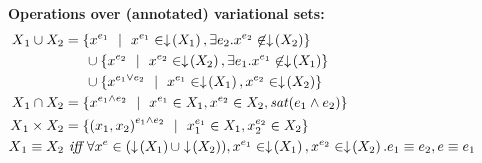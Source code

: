 \begin{figure}
\medskip 
\textbf{Operations over (annotated) variational sets:}
\begin{alignat*}{1}
\vset_1 \cup \vset_2 &= \setDef {\annot [\dimMeta_1] \elem \myOR \annot [\dimMeta_1] \elem \in \pushIn {\vset_1}, \exists \dimMeta_2. \annot [\dimMeta_2] \elem \not \in \pushIn{\vset_2}}\\
&\hspace{15pt} \cup \setDef {\annot [\dimMeta_2] \elem \myOR \annot [\dimMeta_2] \elem \in \pushIn {\vset_2}, 
\exists \dimMeta_1. \annot [\dimMeta_1] \elem  \not \in \pushIn {\vset_1}}\\
&\hspace{15pt} \cup \setDef {\annot [\dimMeta_1 \vee \dimMeta_2] \elem \myOR 
\annot [\dimMeta_1] \elem \in \pushIn {\vset_1}, \annot [\dimMeta_2] \elem \in \pushIn {\vset_2}}\\
\vset_1 \cap \vset_2 &= \setDef {
\annot [\dimMeta_1 \wedge \dimMeta_2 ]\elem \myOR
\annot [\dimMeta_1] \elem \in \vset_1, \annot [\dimMeta_2] \elem \in \vset_2,
\sat {\dimMeta_1 \wedge \dimMeta_2}}\\
\vset_1 \times \vset_2 &= \setDef{
\annot [\dimMeta_1 \wedge \dimMeta_2] {(\elem_1, \elem_2)} \myOR
\annot [\dimMeta_1] \elem_1 \in \vset_1, \annot [\dimMeta_2] \elem_2 \in \vset_2}\\
\vset_1 \equiv \vset_2 &\textit{ iff }
\forall \annot  \elem \in (\filterSet {\vset_1} \cup \filterSet {\vset_2}),
\annot [\dimMeta_1] \elem \in \filterSet {\vset_1}, \annot [\dimMeta_2] \elem \in \filterSet {\vset_2}.
\dimMeta_1 \equiv \dimMeta_2, \dimMeta \equiv \dimMeta_1
\end{alignat*}


\end{figure}
